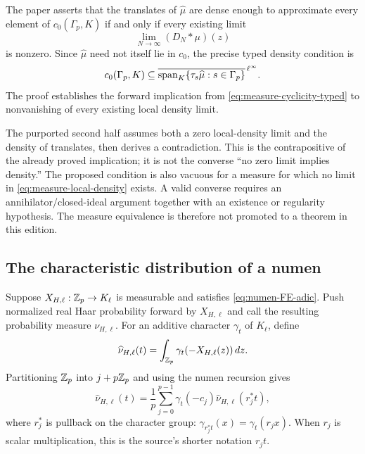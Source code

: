 \begin{status}
The paper asserts that the translates of $\widehat\mu$ are dense enough to
approximate every element of $c_0(\Gamma_p,K)$ if and only if every existing
limit
\[
 \lim_{N\to\infty}(D_N*\mu)(z)
\]
is nonzero.  Since $\widehat\mu$ need not itself lie in $c_0$, the precise
typed density condition is
\begin{equation}
\label{eq:measure-cyclicity-typed}
 c_0(\Gamma_p,K)
 \subseteq\overline{\operatorname{span}_K\{\tau_s\widehat\mu:s\in\Gamma_p\}}^{\,\ell^\infty}.
\end{equation}
The proof establishes the forward implication from
\cref{eq:measure-cyclicity-typed} to nonvanishing of every existing local
density limit.
\end{status}

\begin{sourceissue}
The purported second half assumes both a zero local-density limit and the
density of translates, then derives a contradiction.  This is the
contrapositive of the already proved implication; it is not the converse
``no zero limit implies density.''  The proposed condition is also vacuous
for a measure for which no limit in \cref{eq:measure-local-density} exists.
A valid converse requires an annihilator/closed-ideal argument together with
an existence or regularity hypothesis.  The measure equivalence is therefore
not promoted to a theorem in this edition.
\end{sourceissue}

\subsection{The characteristic distribution of a numen}

Suppose $X_{H,\ell}:\mathbb Z_p\to K_\ell$ is measurable and satisfies
\cref{eq:numen-FE-adic}.  Push normalized real Haar probability forward by
$X_{H,\ell}$ and call the resulting probability measure $\nu_{H,\ell}$.
For an additive character $\gamma_t$ of $K_\ell$, define
\begin{equation}
\label{eq:numen-characteristic}
 \widehat\nu_{H,\ell}(t)
 =\int_{\mathbb Z_p}\gamma_t(-X_{H,\ell}(z))\,dz.
\end{equation}
Partitioning $\mathbb Z_p$ into $j+p\mathbb Z_p$ and using the numen recursion gives
\begin{equation}
\label{eq:numen-characteristic-FE}
 \widehat\nu_{H,\ell}(t)
 =\frac1p\sum_{j=0}^{p-1}
 \gamma_t(-c_j)\widehat\nu_{H,\ell}(r_j^*t),
\end{equation}
where $r_j^*$ is pullback on the character group:
$\gamma_{r_j^*t}(x)=\gamma_t(r_jx)$.  When $r_j$ is scalar multiplication,
this is the source's shorter notation $r_jt$.

